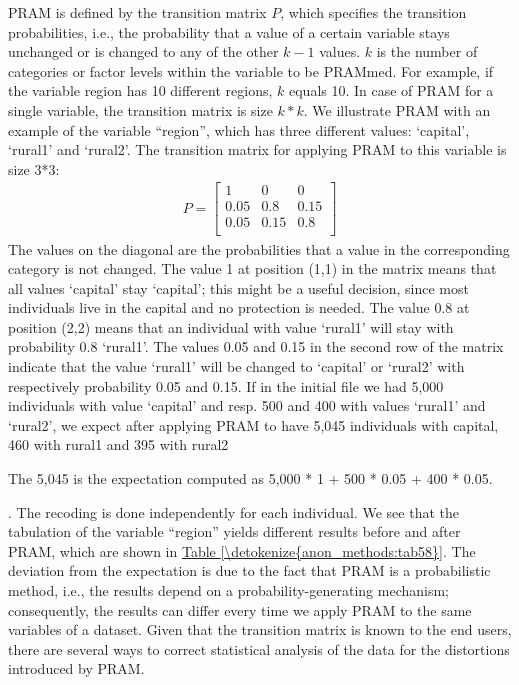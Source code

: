 \documentclass[letterpaper,10pt,english]{sphinxmanual}
\begin{document}
PRAM is defined by the transition matrix \(P\), which specifies the
transition probabilities, i.e., the probability that a value of a
certain variable stays unchanged or is changed to any of the other
\(k - 1\) values. \(k\) is the number of categories or factor
levels within the variable to be PRAMmed. For example, if the variable
region has 10 different regions, \(k\) equals 10. In case of PRAM
for a single variable, the transition matrix is size \(k*k\). We
illustrate PRAM with an example of the variable “region”, which has
three different values: ‘capital’, ‘rural1’ and ‘rural2’. The transition
matrix for applying PRAM to this variable is size 3*3:
\begin{equation*}
\begin{split}P = \begin{bmatrix}
1 & 0 & 0 \\
0.05 & 0.8 & 0.15 \\
0.05 & 0.15 & 0.8 \\
\end{bmatrix}\end{split}
\end{equation*}
The values on the diagonal are the probabilities that a value in the
corresponding category is not changed. The value 1 at position (1,1) in
the matrix means that all values ‘capital’ stay ‘capital’; this might be
a useful decision, since most individuals live in the capital and no
protection is needed. The value 0.8 at position (2,2) means that an
individual with value ‘rural1’ will stay with probability 0.8 ‘rural1’.
The values 0.05 and 0.15 in the second row of the matrix indicate that
the value ‘rural1’ will be changed to ‘capital’ or ‘rural2’ with
respectively probability 0.05 and 0.15. If in the initial file we had
5,000 individuals with value ‘capital’ and resp. 500 and 400 with values
‘rural1’ and ‘rural2’, we expect after applying PRAM to have 5,045
individuals with capital, 460 with rural1 and 395 with
rural2 %
\begin{footnote}[9]\sphinxAtStartFootnote
The 5,045 is the expectation computed as 5,000 * 1 + 500 * 0.05 +
400 * 0.05.
%
\end{footnote}. The recoding is done independently for
each individual. We see that the tabulation of the variable “region”
yields different results before and after PRAM, which are shown in \hyperref[\detokenize{anon_methods:tab58}]{Table \ref{\detokenize{anon_methods:tab58}}}.
The deviation from the expectation is due to the fact that PRAM is
a probabilistic method, i.e., the results depend on a
probability-generating mechanism; consequently, the results can differ
every time we apply PRAM to the same variables of a dataset.  Given that the transition matrix
is known to the end users, there are several ways to correct statistical
analysis of the data for the distortions introduced by PRAM.
\end{document}
